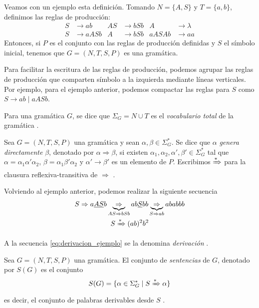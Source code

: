 Veamos con un ejemplo esta definición. Tomando $N=\{A,S\}$ y $T=\{a,b\}$, definimos las reglas de producción:
\begin{align}
    S &\to ab & AS &\to bSb & A &\to\lambda \\
    S &\to aASb & A&\to bSb & aASAb &\to aa
\end{align}
Entonces, si $P$ es el conjunto con las reglas de producción definidas y $S$ el símbolo inicial, tenemos que 
$G=(N,T,S,P)$ es una gramática.

\vspace{10pt}
Para facilitar la escritura de las reglas de producción, podemos agrupar las reglas de producción que comparten
símbolo a la izquierda mediante líneas verticales. Por ejemplo, para el ejemplo anterior, podemos compactar las
reglas para $S$ como $S\to ab\mid aASb$.

\begin{definicion}Para una gramática $G$, se dice que $\Sigma_G=N\cup T$ es el 
\textit{vocabulario total} de la gramática \cite{harrison_1978}. 
\end{definicion}

\begin{definicion}Sea $G=(N,T,S,P)$ una gramática y sean $\alpha,\beta\in\Sigma_G^*$. Se dice que $\alpha$
\textit{genera directamente} $\beta$, denotado por $\alpha\Rightarrow\beta$, si existen 
$\alpha_1,\alpha_2,\alpha',\beta'\in\Sigma_G^*$ tal que $\alpha=\alpha_1\alpha'\alpha_2$, 
$\beta=\alpha_1\beta'\alpha_2$ y $\alpha'\to\beta'$ es un elemento de $P$. Escribimos $\xRightarrow{*}$ para la
clausura reflexiva-transitiva de $\Rightarrow$ \cite{harrison_1978}.    
\end{definicion}

Volviendo al ejemplo anterior, podemos realizar la siguiente secuencia
\begin{gather}\label{eq:derivacion_ejemplo}
    S\Rightarrow a\underline{AS}b \underbrace{\Rightarrow}_{AS\Rightarrow bSb}ab\underline{S}bb
    \underbrace{\Rightarrow}_{S\Rightarrow ab} ababbb \\
    S\xRightarrow{*}(ab)^2b^2
\end{gather}

A la secuencia \eqref{eq:derivacion_ejemplo} se la denomina \textit{derivación} \cite{harrison_1978}.

\begin{definicion}Sea $G=(N,T,S,P)$ una gramática. El conjunto de \textit{sentencias} de $G$, denotado por $S(G)$ es
el conjunto
\begin{equation}
    S(G)=\{\alpha\in\Sigma_G^*\mid S\xRightarrow{*}\alpha\}
\end{equation}
es decir, el conjunto de palabras derivables desde $S$ \cite{harrison_1978}.
\end{definicion}

